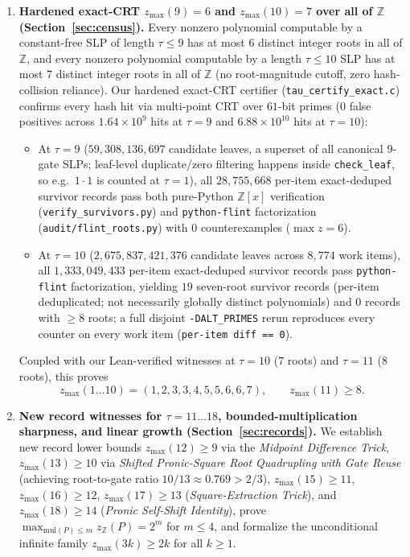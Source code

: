 \documentclass[11pt]{article}
\newcommand{\Z}{\mathbb{Z}}
\newcommand{\code}[1]{\texttt{#1}}
\newcommand{\zmax}{z_{\max}}
\newcommand{\zZ}{z_{\Z}}
\begin{document}
\begin{enumerate}[label=\textbf{Result \arabic*.},leftmargin=2.2em]
  \item \textbf{Hardened exact-CRT $\zmax(9) = 6$ and $\zmax(10) = 7$ over all of $\Z$ (Section~\ref{sec:census}).}
  Every nonzero polynomial computable by a constant-free SLP of length $\tau \le 9$ has at most $6$ distinct integer roots in all of $\Z$, and every nonzero polynomial computable by a length $\tau \le 10$ SLP has at most $7$ distinct integer roots in all of $\Z$ (no root-magnitude cutoff, zero hash-collision reliance). Our hardened exact-CRT certifier (\code{tau\_certify\_exact.c}) confirms every hash hit via multi-point CRT over $61$-bit primes ($0$ false positives across $1.64 \times 10^9$ hits at $\tau = 9$ and $6.88 \times 10^{10}$ hits at $\tau = 10$):
  \begin{itemize}[leftmargin=1.5em]
    \item At $\tau = 9$ ($59{,}308{,}136{,}697$ candidate leaves, a superset of all canonical $9$-gate SLPs; leaf-level duplicate/zero filtering happens inside \code{check\_leaf}, so e.g.\ $1 \cdot 1$ is counted at $\tau = 1$), all $28{,}755{,}668$ per-item exact-deduped survivor records pass both pure-Python $\Z[x]$ verification (\code{verify\_survivors.py}) and \code{python-flint} factorization (\code{audit/flint\_roots.py}) with $0$ counterexamples ($\max z = 6$).
    \item At $\tau = 10$ ($2{,}675{,}837{,}421{,}376$ candidate leaves across $8{,}774$ work items), all $1{,}333{,}049{,}433$ per-item exact-deduped survivor records pass \code{python-flint} factorization, yielding $19$ seven-root survivor records (per-item deduplicated; not necessarily globally distinct polynomials) and $0$ records with $\ge 8$ roots; a full disjoint \code{-DALT\_PRIMES} rerun reproduces every counter on every work item (\code{per-item diff == 0}).
  \end{itemize}
  Coupled with our Lean-verified witnesses at $\tau = 10$ ($7$ roots) and $\tau = 11$ ($8$ roots), this proves
  \[
    \zmax(1 \dots 10) = (1, 2, 3, 3, 4, 5, 5, 6, 6, 7), \qquad \zmax(11) \ge 8.
  \]
  \item \textbf{New record witnesses for $\tau = 11 \dots 18$, bounded-multiplication sharpness, and linear growth (Section~\ref{sec:records}).}
  We establish new record lower bounds $\zmax(12) \ge 9$ via the \emph{Midpoint Difference Trick}, $\zmax(13) \ge 10$ via \emph{Shifted Pronic-Square Root Quadrupling with Gate Reuse} (achieving root-to-gate ratio $10/13 \approx 0.769 > 2/3$), $\zmax(15) \ge 11$, $\zmax(16) \ge 12$, $\zmax(17) \ge 13$ (\emph{Square-Extraction Trick}), and $\zmax(18) \ge 14$ (\emph{Pronic Self-Shift Identity}), prove $\max_{\mathrm{mul}(P) \le m} \zZ(P) = 2^m$ for $m \le 4$, and formalize the unconditional infinite family $\zmax(3k) \ge 2k$ for all $k \ge 1$.

\end{enumerate}
\end{document}
